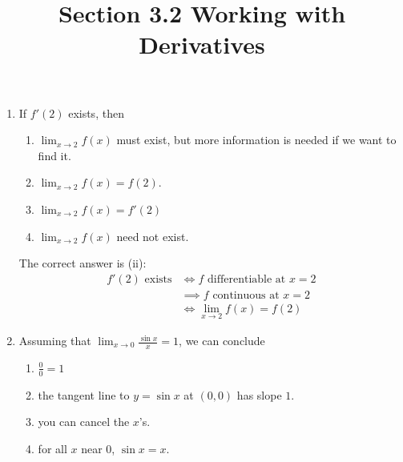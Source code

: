 \documentclass[nooutcomes]{ximera}
\title{Section 3.2 Working with Derivatives}
\begin{document}
\begin{abstract}		\end{abstract}
\maketitle

\begin{problem}
	
	\begin{enumerate}

    \item
   
      If $f'(2)$ exists, then
      \begin{enumerate}
        \item
          $\lim_{x \to 2} f(x)$ must exist, but more information is needed if we want to find it.

        \item
          $\lim_{x \to 2} f(x) = f(2)$.

        \item
          $\lim_{x \to 2} f(x) = f'(2)$

        \item
          $\lim_{x \to 2} f(x)$ need not exist.
      \end{enumerate}
      \begin{freeResponse}
        The correct answer is (ii):
        \begin{align*}
          \mbox{$f'(2)$ exists} &\iff \mbox{$f$ differentiable at $x = 2$}\\
                                &\implies \mbox{$f$ continuous at $x = 2$}\\
                                &\iff \lim_{x \to 2} f(x) = f(2)
        \end{align*}
      \end{freeResponse}


    \item

      Assuming that $\lim_{x \to 0} \frac{\sin x}{x} = 1$, we can conclude
      \begin{enumerate}
        \item
          $\frac{0}{0} = 1$
        \item
          the tangent line to $y = \sin x$ at $(0,0)$ has slope $1$.

        \item
          you can cancel the $x$'s.

        \item
          for all $x$ near $0$, $\sin x = x$.


\end{enumerate}
\end{enumerate}
\end{problem}
\end{document}
